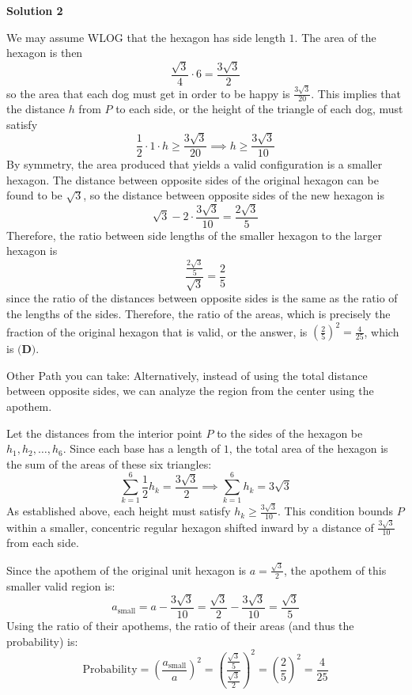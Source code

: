 \begin{enumerate}
\textbf{Solution 2}

We may assume WLOG that the hexagon has side length $1$. The area of the hexagon is then
 \[\frac{\sqrt{3}}{4}\cdot 6=\frac{3\sqrt{3}}{2}\]so the area that each dog must get in order to be happy is $\frac{3\sqrt{3}}{20}$. This implies that the distance $h$ from $P$ to each side, or the height of the triangle of each dog, must satisfy
 \[\frac{1}{2}\cdot 1\cdot h\ge \frac{3\sqrt{3}}{20}\implies h\ge \frac{3\sqrt{3}}{10}\]By symmetry, the area produced that yields a valid configuration is a smaller hexagon. The distance between opposite sides of the original hexagon can be found to be $\sqrt{3}$, so the distance between opposite sides of the new hexagon is
 \[\sqrt{3}-2\cdot \frac{3\sqrt{3}}{10}=\frac{2\sqrt{3}}{5}\]Therefore, the ratio between side lengths of the smaller hexagon to the larger hexagon is
 \[\frac{\frac{2\sqrt{3}}{5}}{\sqrt{3}}=\frac{2}{5}\]since the ratio of the distances between opposite sides is the same as the ratio of the lengths of the sides. Therefore, the ratio of the areas, which is precisely the fraction of the original hexagon that is valid, or the answer, is $\left(\frac{2}{5}\right)^2=\frac{4}{25}$, which is $\boxed{\textbf{(D)}}$.

 


 
Other Path you can take: Alternatively, instead of using the total distance between opposite sides, we can analyze the region from the center using the apothem. 

 Let the distances from the interior point $P$ to the sides of the hexagon be $h_1, h_2, \dots, h_6$. Since each base has a length of $1$, the total area of the hexagon is the sum of the areas of these six triangles:
 \[\sum_{k=1}^6 \frac{1}{2}h_k = \frac{3\sqrt{3}}{2} \implies \sum_{k=1}^6 h_k = 3\sqrt{3}\]As established above, each height must satisfy $h_k \ge \frac{3\sqrt{3}}{10}$. This condition bounds $P$ within a smaller, concentric regular hexagon shifted inward by a distance of $\frac{3\sqrt{3}}{10}$ from each side. 

 Since the apothem of the original unit hexagon is $a = \frac{\sqrt{3}}{2}$, the apothem of this smaller valid region is:
 \[a_{\text{small}} = a - \frac{3\sqrt{3}}{10} = \frac{\sqrt{3}}{2} - \frac{3\sqrt{3}}{10} = \frac{\sqrt{3}}{5}\]Using the ratio of their apothems, the ratio of their areas (and thus the probability) is:
 \[\text{Probability} = \left( \frac{a_{\text{small}}}{a} \right)^2 = \left( \frac{\frac{\sqrt{3}}{5}}{\frac{\sqrt{3}}{2}} \right)^2 = \left( \frac{2}{5} \right)^2 = \frac{4}{25}\]




\end{enumerate}
